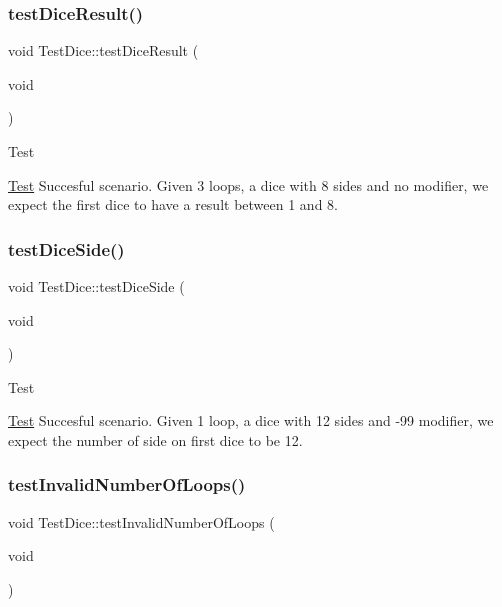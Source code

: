 \subsubsection{\texorpdfstring{test\+Dice\+Result()}{testDiceResult()}}
{\footnotesize\ttfamily void Test\+Dice\+::test\+Dice\+Result (\begin{DoxyParamCaption}\item[{void}]{ }\end{DoxyParamCaption})\hspace{0.3cm}{\ttfamily [protected]}}

\begin{DoxyRefDesc}{Test}
\item[\hyperlink{test__test000007}{Test}]Succesful scenario. Given 3 loops, a dice with 8 sides and no modifier, we expect the first dice to have a result between 1 and 8. \end{DoxyRefDesc}
\hypertarget{class_test_dice_a205145e759d361c35ad0c5c5056a76f8}{}\label{class_test_dice_a205145e759d361c35ad0c5c5056a76f8} 
\subsubsection{\texorpdfstring{test\+Dice\+Side()}{testDiceSide()}}
{\footnotesize\ttfamily void Test\+Dice\+::test\+Dice\+Side (\begin{DoxyParamCaption}\item[{void}]{ }\end{DoxyParamCaption})\hspace{0.3cm}{\ttfamily [protected]}}

\begin{DoxyRefDesc}{Test}
\item[\hyperlink{test__test000008}{Test}]Succesful scenario. Given 1 loop, a dice with 12 sides and -\/99 modifier, we expect the number of side on first dice to be 12. \end{DoxyRefDesc}
\hypertarget{class_test_dice_a32c88d603100adb9592371f2e75a2f9f}{}\label{class_test_dice_a32c88d603100adb9592371f2e75a2f9f} 
\subsubsection{\texorpdfstring{test\+Invalid\+Number\+Of\+Loops()}{testInvalidNumberOfLoops()}}
{\footnotesize\ttfamily void Test\+Dice\+::test\+Invalid\+Number\+Of\+Loops (\begin{DoxyParamCaption}\item[{void}]{ }\end{DoxyParamCaption})\hspace{0.3cm}{\ttfamily [protected]}}


